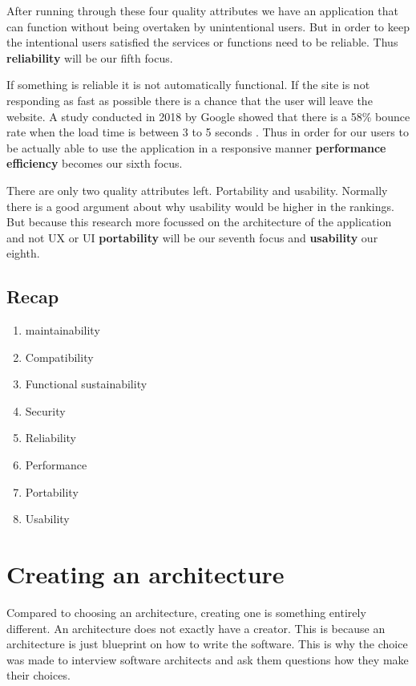 After running through these four quality attributes we have an application that can function without being overtaken by unintentional users. But in order to keep the intentional users satisfied the services or functions need to be reliable. Thus \textbf{reliability} will be our fifth focus.

If something is reliable it is not automatically functional. If the site is not responding as fast as possible there is a chance that the user will leave the website. A study conducted in 2018 by Google showed that there is a 58\% bounce rate when the load time is between 3 to 5 seconds \cite{bounceRateDifference}. Thus in order for our users to be actually able to use the application in a responsive manner \textbf{performance efficiency} becomes our sixth focus.

There are only two quality attributes left. Portability and usability. Normally there is a good argument about why usability would be higher in the rankings. But because this research more focussed on the architecture of the application and not UX or UI \textbf{portability} will be our seventh focus and \textbf{usability} our eighth.

\subsection{Recap}
\label{sec:IsoRecap}

\begin{enumerate}
        \item maintainability
        \item Compatibility
        \item Functional sustainability
        \item Security
        \item Reliability
        \item Performance
        \item Portability
        \item Usability
\end{enumerate}

\section{Creating an architecture}

Compared to choosing an architecture, creating one is something entirely different. An architecture does not exactly have a creator. This is because an architecture is just blueprint on how to write the software. This is why the choice was made to interview software architects and ask them questions how they make their choices.

